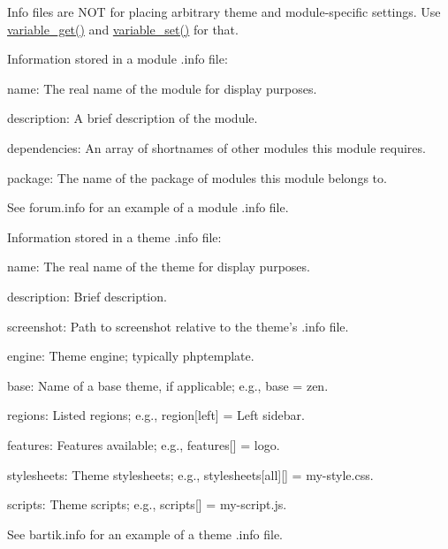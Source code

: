 Info files are NOT for placing arbitrary theme and module-\/specific settings. Use \hyperlink{bootstrap_8inc_a1be2160d5e5a1a9b9a0c90944c4f5252}{variable\_\-get()} and \hyperlink{bootstrap_8inc_a9859faa6fcd56ca6048be93dace95999}{variable\_\-set()} for that.

Information stored in a module .info file:
\begin{DoxyItemize}
\item name: The real name of the module for display purposes.
\item description: A brief description of the module.
\item dependencies: An array of shortnames of other modules this module requires.
\item package: The name of the package of modules this module belongs to.
\end{DoxyItemize}

See forum.info for an example of a module .info file.

Information stored in a theme .info file:
\begin{DoxyItemize}
\item name: The real name of the theme for display purposes.
\item description: Brief description.
\item screenshot: Path to screenshot relative to the theme's .info file.
\item engine: Theme engine; typically phptemplate.
\item base: Name of a base theme, if applicable; e.g., base = zen.
\item regions: Listed regions; e.g., region\mbox{[}left\mbox{]} = Left sidebar.
\item features: Features available; e.g., features\mbox{[}\mbox{]} = logo.
\item stylesheets: Theme stylesheets; e.g., stylesheets\mbox{[}all\mbox{]}\mbox{[}\mbox{]} = my-\/style.css.
\item scripts: Theme scripts; e.g., scripts\mbox{[}\mbox{]} = my-\/script.js.
\end{DoxyItemize}

See bartik.info for an example of a theme .info file.


